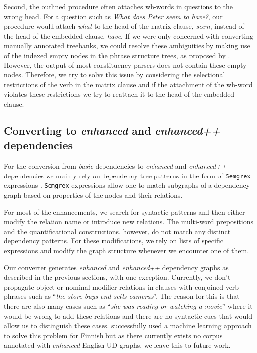 \documentclass[10pt, a4paper]{article}
\begin{document}
Second, the outlined procedure often attaches wh-words in questions to the wrong head. 
For a question such as \textit{What does Peter seem to have?}, 
our procedure would attach \textit{what} to the head of the matrix clause, \textit{seem},
instead of the head of the embedded clause, \textit{have}. 
If we were only concerned with converting manually annotated treebanks, we could resolve these ambiguities
by making use of  the indexed empty nodes in the phrase structure trees, as proposed by .
However, the output of most constituency parsers does not contain these empty nodes. Therefore, we try to solve 
this issue by considering the selectional restrictions of the verb in the matrix clause and if the attachment of the wh-word
violates these restrictions we try to reattach it to the head of the embedded clause.


\subsection{Converting to \textit{enhanced} and \textit{enhanced++} dependencies}

For the conversion from \textit{basic} dependencies to \textit{enhanced} and \textit{enhanced++} dependencies
we mainly rely on dependency tree patterns in the form of \texttt{Semgrex} expressions \cite{chambers07learning}. \texttt{Semgrex} 
expressions allow one to match subgraphs of a dependency graph based on properties of the nodes and their relations.

For most of the enhancements, we search for syntactic patterns and then either modify the relation name or introduce new relations.
The multi-word prepositions and the quantificational constructions, however, do not match any distinct dependency patterns. For these 
modifications, we rely on lists of specific expressions and modify the graph structure whenever we encounter one of them.

Our converter generates \textit{enhanced} and \textit{enhanced++} dependency graphs as described in the previous sections, with one exception.
Currently, we don't propagate object or nominal modifier relations in clauses with conjoined verb phrases such as ``\textit{the store buys and sells cameras}''.
The reason for this is that there are also many cases such as ``\textit{she was reading or watching a movie}'' where it would be wrong to add these relations
and there are no syntactic cues that would allow us to distinguish these cases.  successfully used a machine learning approach
to solve this problem for Finnish but as there currently exists no corpus annotated with \textit{enhanced} English UD graphs, we leave this to future work.
\end{document}
